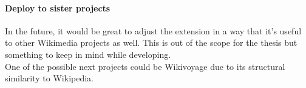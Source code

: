   \paragraph{Deploy to sister projects}
  In the future, it would be great to adjust the extension in a way that it's useful to other Wikimedia projects as well. This is out of the scope for the thesis but something to keep in mind while developing. \\
  One of the possible next projects could be Wikivoyage due to its structural similarity to Wikipedia.